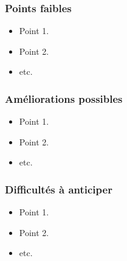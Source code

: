 \documentclass[a4paper,11pt]{article}%
\begin{document}
\subsubsection*{Points faibles}
\begin{itemize}
\item Point 1.
\item Point 2.
\item etc.
\end{itemize}

\subsubsection*{Améliorations possibles}
\begin{itemize}
\item Point 1.
\item Point 2.
\item etc.
\end{itemize}

\subsubsection*{Difficultés à anticiper}
\begin{itemize}
\item Point 1.
\item Point 2.
\item etc.
\end{itemize}
\end{document}
